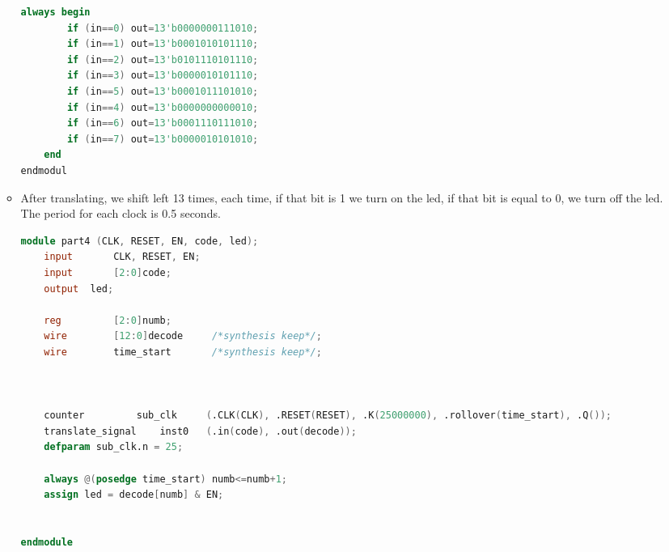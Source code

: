 \begin{itemize}
\begin{itemize}
\begin{lstlisting}[language = verilog]
	always begin
		if (in==0) out=13'b0000000111010;
		if (in==1) out=13'b0001010101110;
		if (in==2) out=13'b0101110101110;
		if (in==3) out=13'b0000010101110;
		if (in==5) out=13'b0001011101010;
		if (in==4) out=13'b0000000000010;
		if (in==6) out=13'b0001110111010;
		if (in==7) out=13'b0000010101010;
	end
endmodul
                \end{lstlisting}
            \item [] After translating, we shift left 13 times, each time, if that bit is 1 we turn on the led, if that  bit is equal to 0, we turn off the led. The period for each clock is 0.5 seconds.
                \begin{lstlisting}[language=verilog]
module part4 (CLK, RESET, EN, code, led);
	input		CLK, RESET, EN;
	input		[2:0]code;
	output	led;

	reg 		[2:0]numb;
	wire		[12:0]decode	 /*synthesis keep*/;
	wire		time_start		 /*synthesis keep*/;
	
	
	
	counter 		sub_clk 	(.CLK(CLK), .RESET(RESET), .K(25000000), .rollover(time_start), .Q());
	translate_signal	inst0 	(.in(code), .out(decode));
	defparam sub_clk.n = 25;
	
	always @(posedge time_start) numb<=numb+1;
	assign led = decode[numb] & EN;
	
				
endmodule
                \end{lstlisting}
        \end{itemize}
\end{itemize}

\clearpage
